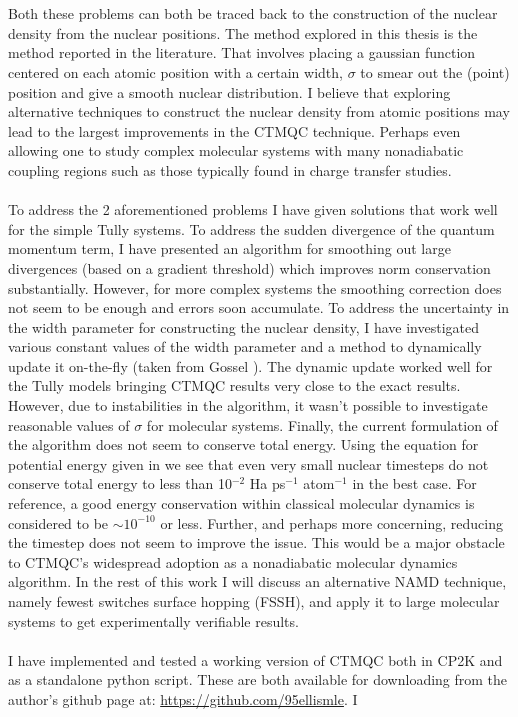 \\\\
Both these problems can both be traced back to the construction of the nuclear density from the nuclear positions. The method explored in this thesis is the method reported in the literature. That involves placing a gaussian function centered on each atomic position with a certain width, $\sigma$ to smear out the (point) position and give a smooth nuclear distribution. I believe that exploring alternative techniques to construct the nuclear density from atomic positions may lead to the largest improvements in the CTMQC technique. Perhaps even allowing one to study complex molecular systems with many nonadiabatic coupling regions such as those typically found in charge transfer studies. 
\\\\
To address the 2 aforementioned problems I have given solutions that work well for the simple Tully systems. To address the sudden divergence of the quantum momentum term, I have presented an algorithm for smoothing out large divergences (based on a gradient threshold) which improves norm conservation substantially. However, for more complex systems the smoothing correction does not seem to be enough and errors soon accumulate. To address the uncertainty in the width parameter for constructing the nuclear density, I have investigated various constant values of the width parameter and a method to dynamically update it on-the-fly (taken from Gossel \cite{gossel_coupled-trajectory_2018}). The dynamic update worked well for the Tully models bringing CTMQC results very close to the exact results. However, due to instabilities in the algorithm, it wasn't possible to investigate reasonable values of $\sigma$ for molecular systems. Finally, the current formulation of the algorithm does not seem to conserve total energy. Using the equation for potential energy given in \cite{agostini_semiclassical_2015} we see that even very small nuclear timesteps do not conserve total energy to less than 10$^{-2}$ Ha ps$^{-1}$ atom$^{-1}$ in the best case. For reference,  a good energy conservation within classical molecular dynamics is considered to be $\sim 10^{-10}$ or less. Further, and perhaps more concerning, reducing the timestep does not seem to improve the issue. This would be a major obstacle to CTMQC's widespread adoption as a nonadiabatic molecular dynamics algorithm. In the rest of this work I will discuss an alternative NAMD technique, namely fewest switches surface hopping (FSSH), and apply it to large molecular systems to get experimentally verifiable results.
\\\\
I have implemented and tested a working version of CTMQC both in CP2K and as a standalone python script. These are both available for downloading from the author's github page at: \href{https://github.com/95ellismle}{https://github.com/95ellismle}. I
